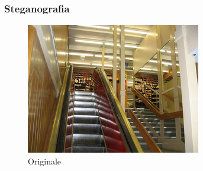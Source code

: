 \documentclass{beamer}
\begin{document}
\begin{frame}
  \frametitle{Steganografia}

  \begin{minipage}{.45\linewidth}
    \begin{figure}
      \centering
      \includegraphics[width=.9\linewidth]{img/mrhyde-foto0.png}
      \caption{Originale}
      \label{fig:steg0}
    \end{figure}
  \end{minipage}
  \hfill
\end{frame}
\end{document}
